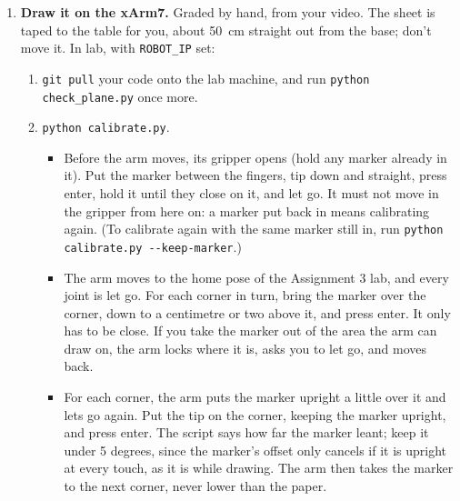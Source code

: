 \documentclass{16384_doc}
\begin{document}
\begin{questions}
\begin{enumerate}[label=\alph*.]
        \item \text{[40 points]} \textbf{Draw it on the xArm7.}  Graded by hand,
        from your video.  The sheet is taped to the table for
        you, about 50~cm straight out from the base; don't move it.  In lab, with
        \verb!ROBOT_IP! set:
        \begin{enumerate}[label=(\roman*)]
            \item \verb!git pull! your code onto the lab machine, and run
                  \verb!python check_plane.py! once more.
            \item \verb!python calibrate.py!.
                  \begin{itemize}
                      \item Before the arm moves, its gripper opens (hold any
                            marker already in it).  Put the marker between the
                            fingers, tip down and straight, press enter, hold it
                            until they close on it, and let go.  It must not move in the gripper
                            from here on: a marker put back in means calibrating
                            again.  (To calibrate again with the same marker
                            still in, run \verb!python calibrate.py --keep-marker!.)
                      \item The arm moves to the home pose of the Assignment 3
                            lab, and every joint is let go.  For each corner in
                            turn, bring the marker over the corner, down to a
                            centimetre or two above it, and press enter.  It only
                            has to be close.  If you take the marker out of the
                            area the arm can draw on, the arm locks where it is,
                            asks you to let go, and moves back.
                      \item For each corner, the arm puts the marker upright a
                            little over it and lets go again.  Put the tip on the
                            corner, keeping the marker upright, and press enter.
                            The script says how far the marker leant; keep it
                            under 5 degrees, since the marker's offset only
                            cancels if it is upright at every touch, as it is
                            while drawing.  The arm then takes the marker to the
                            next corner, never lower than the paper.
                  \end{itemize}

\end{enumerate}
\end{enumerate}
\end{questions}
\end{document}
